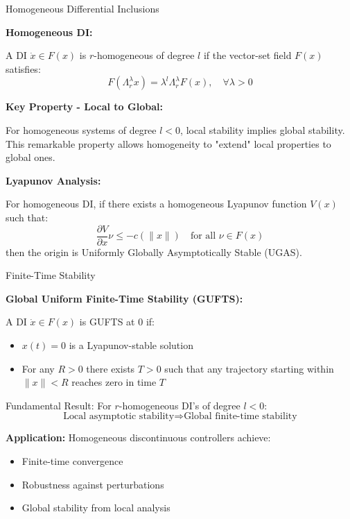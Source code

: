 \begin{frame}{Homogeneous Differential Inclusions}

	\textbf{Homogeneous DI:}

	A DI $\dot{x} \in F(x)$ is $r$-homogeneous of degree $l$ if the vector-set field $F(x)$ satisfies:
	$$F(\Lambda_r^\lambda x) = \lambda^l \Lambda_r^\lambda F(x), \quad \forall \lambda > 0$$

	\vspace{0.5cm}
	\textbf{Key Property - Local to Global:}

	For homogeneous systems of degree $l < 0$, \alert{local stability implies global stability}. This remarkable property allows homogeneity to "extend" local properties to global ones.

	\vspace{0.5cm}
	\textbf{Lyapunov Analysis:}

	For homogeneous DI, if there exists a homogeneous Lyapunov function $V(x)$ such that:
	$$\frac{\partial V}{\partial x} \nu \leq -c(\|x\|) \quad \text{for all } \nu \in F(x)$$
	then the origin is Uniformly Globally Asymptotically Stable (UGAS).

\end{frame}

\begin{frame}{Finite-Time Stability}

	\textbf{Global Uniform Finite-Time Stability (GUFTS):}

	A DI $\dot{x} \in F(x)$ is GUFTS at 0 if:
	\begin{itemize}
		\item $x(t) = 0$ is a Lyapunov-stable solution
		\item For any $R > 0$ there exists $T > 0$ such that any trajectory starting within $\|x\| < R$ reaches zero in time $T$
	\end{itemize}

	\vspace{0.5cm}
	\alert{Fundamental Result:} For $r$-homogeneous DI's of degree $l < 0$:
	$$\text{Local asymptotic stability} \Rightarrow \text{Global finite-time stability}$$

	\vspace{0.5cm}
	\textbf{Application:} Homogeneous discontinuous controllers achieve:
	\begin{itemize}
		\item Finite-time convergence
		\item Robustness against perturbations
		\item Global stability from local analysis
	\end{itemize}

\end{frame}
